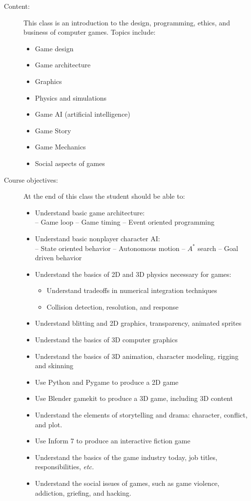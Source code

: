 \documentclass{article}
\begin{document}
\begin{description}
\item
[Content:]
This class is an introduction to the design, programming, ethics,
and business
of computer games.  Topics include:
\begin{multicols}{2}
  \begin{itemize}
\item Game design
  \item
 Game architecture
  \item
 Graphics
  \item
 Physics and simulations
  \item
 Game AI (artificial intelligence)
  \item
 Game Story
 \item Game Mechanics
  \item
 Social aspects of games
  \end{itemize}
\end{multicols}
\item
[Course objectives:]
At the end of this class the student should be able to:
  \begin{itemize}
  \item Understand basic game architecture:
\\
-- Game loop\hfill
-- Game timing\hfill
-- Event oriented programming\hfill\mbox{}
  \item Understand basic nonplayer character AI:
\\
-- State oriented behavior\hfill
-- Autonomous motion\hfill
-- $A^*$ search\hfill
-- Goal driven behavior\hfill\mbox{}
  \item Understand the basics of 2D and 3D physics necessary for games:
\begin{itemize}
  \item Understand tradeoffs in numerical integration techniques
  \item Collision detection, resolution, and response
\end{itemize}
  \item Understand blitting and 2D graphics, transparency, animated sprites
  \item Understand the basics of 3D computer graphics
  \item Understand the basics of 3D animation, character modeling,
rigging and skinning
  \item Use Python and Pygame to produce a 2D game
  \item Use Blender gamekit to produce a 3D game, including 3D content
  \item Understand the elements of storytelling and drama:
character, conflict, and plot.
  \item Use Inform 7 to produce an interactive fiction game
  \item Understand the basics of the game industry today, job titles,
responsibilities, {\em etc.}
  \item Understand the social issues of games, such as
     game violence, addiction, griefing, and hacking.
  \end{itemize}



\end{description}
\end{document}
